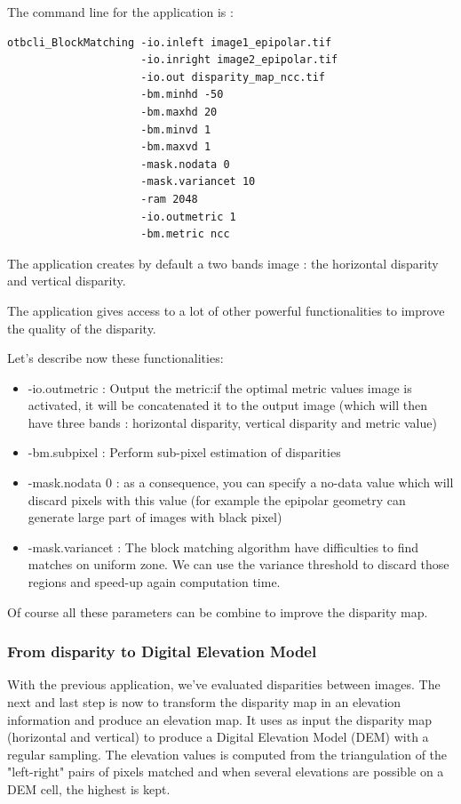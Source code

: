 The command line for the  application is :
\begin{verbatim}
otbcli_BlockMatching -io.inleft image1_epipolar.tif
                     -io.inright image2_epipolar.tif
                     -io.out disparity_map_ncc.tif
                     -bm.minhd -50
                     -bm.maxhd 20
                     -bm.minvd 1
                     -bm.maxvd 1
                     -mask.nodata 0
                     -mask.variancet 10
                     -ram 2048
                     -io.outmetric 1
                     -bm.metric ncc
\end{verbatim}

The application creates by default a two bands image : the horizontal disparity
and vertical disparity.

The  application gives access to a lot of other
powerful functionalities to improve the quality of the disparity.

Let's describe now these functionalities:

\begin{itemize}
\item -io.outmetric : Output the metric:if the optimal metric values image is
  activated, it will be concatenated it to the output image (which will then
  have three bands : horizontal disparity, vertical disparity and metric value)
\item -bm.subpixel : Perform sub-pixel estimation of disparities
\item -mask.nodata 0 : as a consequence, you can specify a no-data value which
  will discard pixels with this value (for example the epipolar geometry can
  generate large part of images with black pixel)
\item -mask.variancet : The block matching algorithm have difficulties to find
  matches on uniform zone. We can use the variance threshold to discard those
  regions and speed-up again computation time.
\end{itemize}

Of course all these parameters can be combine to improve the disparity map.

\subsubsection{From disparity to Digital Elevation Model}

With the previous application, we've evaluated disparities between images. The
next and last step is now to transform the disparity map in an elevation
information and produce an elevation map.  It uses as input the disparity map
(horizontal and vertical) to produce a Digital Elevation Model (DEM) with a
regular sampling. The elevation values is computed from the triangulation of the
"left-right" pairs of pixels matched and when several elevations are possible on
a DEM cell, the highest is kept.

